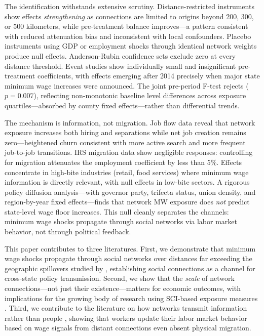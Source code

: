 \documentclass[12pt]{article}
\begin{document}
The identification withstands extensive scrutiny. Distance-restricted instruments show effects \textit{strengthening} as connections are limited to origins beyond 200, 300, or 500 kilometers, while pre-treatment balance improves---a pattern consistent with reduced attenuation bias and inconsistent with local confounders. Placebo instruments using GDP or employment shocks through identical network weights produce null effects. Anderson-Rubin confidence sets exclude zero at every distance threshold. Event studies show individually small and insignificant pre-treatment coefficients, with effects emerging after 2014 precisely when major state minimum wage increases were announced. The joint pre-period F-test rejects ($p = 0.007$), reflecting non-monotonic baseline level differences across exposure quartiles---absorbed by county fixed effects---rather than differential trends.

The mechanism is information, not migration. Job flow data reveal that network exposure increases both hiring and separations while net job creation remains zero---heightened churn consistent with more active search and more frequent job-to-job transitions. IRS migration data show negligible responses: controlling for migration attenuates the employment coefficient by less than 5\%. Effects concentrate in high-bite industries (retail, food services) where minimum wage information is directly relevant, with null effects in low-bite sectors. A rigorous policy diffusion analysis---with governor party, trifecta status, union density, and region-by-year fixed effects---finds that network MW exposure does \textit{not} predict state-level wage floor increases. This null cleanly separates the channels: minimum wage shocks propagate through social networks via labor market behavior, not through political feedback.

This paper contributes to three literatures. First, we demonstrate that minimum wage shocks propagate through social networks over distances far exceeding the geographic spillovers studied by \citet{dube2014designing}, establishing social connections as a channel for cross-state policy transmission. Second, we show that the \textit{scale} of network connections---not just their existence---matters for economic outcomes, with implications for the growing body of research using SCI-based exposure measures \citep{bailey2018social, bailey2018house, chetty2022social}. Third, we contribute to the literature on how networks transmit information rather than people \citep{jager2024worker, kramarz2023, faberman2022}, showing that workers update their labor market behavior based on wage signals from distant connections even absent physical migration.
\end{document}
